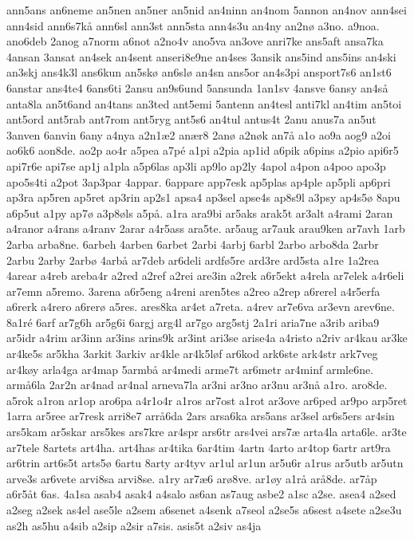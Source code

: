 {ann5ans
an6neme
an5nen
an5ner
an5nid
an4ninn
an4nom
5annon
an4nov
ann4sei
ann4sid
ann6s7kå
ann6sl
ann3st
ann5sta
ann4s3u
an4ny
an2nø
a3no.
a9noa.
ano6deb
2anog
a7norm
a6not
a2no4v
ano5va
an3ove
anri7ke
ans5aft
ansa7ka
4ansan
3ansat
an4sek
an4sent
anseri8e9ne
an4ses
3ansik
ans5ind
ans5ins
an4ski
an3skj
ans4k3l
ans6kun
an5skø
an6slø
an4sn
ans5or
an4s3pi
ansport7s6
an1st6
6anstar
ans4te4
6ans6ti  
2ansu
an9s6und
5ansunda
1an1sv
4ansve
6ansy
an4så
anta8la
an5t6and
an4tans
an3ted
ant5emi
5antenn
an4tesl
anti7kl
an4tim
an5toi
ant5ord
ant5rab
ant7rom
ant5ryg
ant5s6
an4tul
antus4t
2anu
anus7a
an5ut
3anven
6anvin
6any
a4nya
a2n1æ2
anær8
2anø
a2nøk
an7å
a1o
ao9a
aog9
a2oi
ao6k6
aon8de.
ao2p
ao4r
a5pea
a7pé
a1pi
a2pia
ap1id
a6pik
a6pins
a2pio
api6r5
api7r6e
api7se
ap1j
a1pla
a5p6las
ap3li
ap9lo
ap2ly
4apol
a4pon
a4poo
apo3p
apo5s4ti
a2pot
3ap3par
4appar.
6appare
app7esk
ap5plas
ap4ple
ap5pli
ap6pri
ap3ra
ap5ren
ap5ret
ap3rin
ap2s1
apsa4
ap3sel
apse4s
ap8s9l
a3psy
ap4s5ø
8apu
a6p5ut
a1py
ap7ø
a3p8øls
a5på.
a1ra
ara9bi
ar5aks
arak5t
ar3alt
a4rami
2aran
a4ranor
a4rans
a4ranv
2arar
a4r5ass
ara5te.
ar5aug
ar7auk
arau9ken
ar7avh
1arb
2arba
arba8ne.
6arbeh
4arben
6arbet
2arbi
4arbj
6arbl
2arbo
arbo8da
2arbr
2arbu
2arby
2arbø
4arbå
ar7deb
ar6deli
ardfø5re
ard3re
ard5sta
a1re
1a2rea
4arear
a4reb
areba4r
a2red
a2ref
a2rei
are3in
a2rek
a6r5ekt
a4rela
ar7elek
a4r6eli
ar7emn
a5remo.
3arena
a6r5eng
a4reni
aren5tes
a2reo
a2rep
a6rerel
a4r5erfa
a6rerk
a4rero
a6rerø
a5res.
ares8ka
ar4et
a7reta.
a4rev
ar7e6va
ar3evn
arev6ne.
8a1ré
6arf
ar7g6h
ar5g6i
6argj
arg4l
ar7go
arg5stj
2a1ri
aria7ne
a3rib
ariba9
ar5idr
a4rim
ar3inn
ar3ins
arins9k
ar3int
ari3se
arise4a
a4risto
a2riv
ar4kau
ar3ke
ar4ke5s
ar5kha
3arkit
3arkiv
ar4kle
ar4k5løf
ar6kod
ark6ste
ark4str
ark7veg
ar4køy
arla4ga
ar4map
5armbå
ar4medi
arme7t
ar6metr
ar4minf
armle6ne.
armå6la
2ar2n
ar4nad
ar4nal
arneva7la
ar3ni
ar3no
ar3nu
ar3nå
a1ro.
aro8de.
a5rok
a1ron
ar1op
aro6pa
a4r1o4r
a1ros
ar7ost
a1rot
ar3ove
ar6ped
ar9po
arp5ret
1arra
ar5ree
ar7resk
arri8e7
arrå6da
2ars
arsa6ka
ars5ans
ar3sel
ar6s5ers
ar4sin
ars5kam
ar5skar
ars5kes
ars7kre
ar4spr
ars6tr
ars4vei
ars7æ
arta4la
arta6le.
ar3te
ar7tele
8artets
art4ha.
art4has
ar4tika
6ar4tim
4artn
4arto
ar4top
6artr
art9ra
ar6trin
art6s5t
arts5ø
6artu
8arty
ar4tyv
ar1ul
ar1un
ar5u6r
a1rus
ar5utb
ar5utn
arve3s
ar6vete
arvi8sa
arvi8se.
a1ry
ar7æ6
arø8ve.
ar1øy
a1rå
arå8de.
ar7åp
a6r5åt
6as.
4a1sa
asab4
asak4
a4salo
as6an
as7aug
asbe2
a1sc
a2se.
asea4
a2sed
a2seg
a2sek
as4el
ase5le
a2sem
a6senet
a4senk
a7seol
a2se5s
a6sest
a4sete
a2se3u
as2h
as5hu
a4sib
a2sip
a2sir
a7sis.
asis5t
a2siv
as4ja
}
